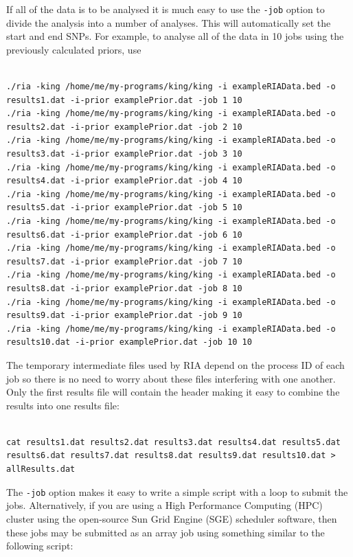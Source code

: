 \documentclass[a4paper,12pt]{article}
\newcommand{\code}[1]{{\footnotesize{{\tt #1}}}}
\begin{document}
If all of the data is to be analysed it is much easy to use the \code{-job} option to divide the analysis into a number of analyses. This will automatically set the start and end SNPs. For example, to analyse all of the data in 10 jobs using the previously calculated priors, use 
\vspace{0.35cm} \begin{lstlisting}

./ria -king /home/me/my-programs/king/king -i exampleRIAData.bed -o results1.dat -i-prior examplePrior.dat -job 1 10
./ria -king /home/me/my-programs/king/king -i exampleRIAData.bed -o results2.dat -i-prior examplePrior.dat -job 2 10
./ria -king /home/me/my-programs/king/king -i exampleRIAData.bed -o results3.dat -i-prior examplePrior.dat -job 3 10
./ria -king /home/me/my-programs/king/king -i exampleRIAData.bed -o results4.dat -i-prior examplePrior.dat -job 4 10
./ria -king /home/me/my-programs/king/king -i exampleRIAData.bed -o results5.dat -i-prior examplePrior.dat -job 5 10
./ria -king /home/me/my-programs/king/king -i exampleRIAData.bed -o results6.dat -i-prior examplePrior.dat -job 6 10
./ria -king /home/me/my-programs/king/king -i exampleRIAData.bed -o results7.dat -i-prior examplePrior.dat -job 7 10
./ria -king /home/me/my-programs/king/king -i exampleRIAData.bed -o results8.dat -i-prior examplePrior.dat -job 8 10
./ria -king /home/me/my-programs/king/king -i exampleRIAData.bed -o results9.dat -i-prior examplePrior.dat -job 9 10
./ria -king /home/me/my-programs/king/king -i exampleRIAData.bed -o results10.dat -i-prior examplePrior.dat -job 10 10

\end{lstlisting} \vspace{0.35cm}
The temporary intermediate files used by RIA depend on the process ID of each job so there is no need to worry about these files interfering with one another. Only the first results file will contain the header making it easy to combine the results into one results file: 
\vspace{0.35cm} \begin{lstlisting}

cat results1.dat results2.dat results3.dat results4.dat results5.dat results6.dat results7.dat results8.dat results9.dat results10.dat > allResults.dat

\end{lstlisting} \vspace{0.35cm}
The \code{-job} option makes it easy to write a simple script with a loop to submit the jobs. Alternatively, if you are using a High Performance Computing (HPC) cluster using the open-source Sun Grid Engine (SGE) scheduler software, then these jobs may be submitted as an array job using something similar to the following script: 
\end{document}

